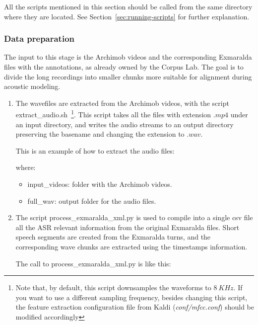 \documentclass[11pt,a4paper,titlepage,twoside]{article}
\begin{document}
All the scripts mentioned in this section should be called from the same directory where they are located. See Section~\ref{sec:running-scripts} for further explanation.

\subsubsection{Data preparation}
\label{sec:data-preparation}

The input to this stage is the Archimob videos and the corresponding Exmaralda files with the annotations, as already owned by the Corpus Lab. The goal is to divide the long recordings into smaller chunks more suitable for alignment during acoustic modeling.

\begin{enumerate}
\item The wavefiles are extracted from the Archimob videos, with the script extract\_audio.sh~\footnote{Note that, by default, this script downsamples the waveforms to $8~KHz$. If you want to use a different sampling frequency, besides changing this script, the feature extraction configuration file from Kaldi (\textit{conf/mfcc.conf}) should be modified accordingly}. This script takes all the files with extension $.mp4$ under an input directory, and writes the audio streams to an output directory preserving the basename and changing the extension to $.wav$.

This is an example of how to extract the audio files:

\begin{center}
  \scriptsize
\end{center}

where:

\begin{itemize}
\item input\_videos: folder with the Archimob videos.
\item full\_wav: output folder for the audio files.
\end{itemize}

\item The script process\_exmaralda\_xml.py is used to compile into a single csv file all the ASR relevant information from the original Exmaralda files. Short speech segments are created from the Exmaralda turns, and the corresponding wave chunks are extracted using the timestamps information.

The call to process\_exmaralda\_xml.py is like this:


\end{enumerate}
\end{document}
